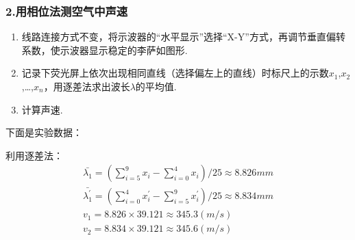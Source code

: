 \documentclass[12pt,a4paper,UTF8]{ctexart}
\begin{document}
	\subsubsection*{2.用相位法测空气中声速}
		\begin{enumerate}[(1)]
		\item 线路连接方式不变，将示波器的“水平显示”选择“X-Y”方式，再调节垂直偏转系数，使示波器显示稳定的李萨如图形.
		\item 记录下荧光屏上依次出现相同直线（选择偏左上的直线）时标尺上的示数$x_1$,$x_2$,\dots,$x_n$，用逐差法求出波长$\lambda$的平均值.
		\item 计算声速.
		\end{enumerate}
		下面是实验数据：
		\begin{table}[htbp]
		\centering
		\caption{极值法测空气中声速数据表}
		\end{table}
		
		
			
		\newpage
		利用逐差法：
		\begin{gather*}
		\bar{\lambda_1}=(\sum_{i=5}^{9}x_i - \sum_{i=0}^{4}x_i)/25 \approx 8.826mm \\
		\bar{\lambda_1^{\prime}}=(\sum_{i=0}^{4}x_i^{\prime} - \sum_{i=5}^{9}x_i^{\prime})/25 \approx 8.834mm \\
		v_1=8.826 \times 39.121 \approx 345.3(m/s) \\
		v_2=8.834 \times 39.121 \approx 345.6(m/s)
		\end{gather*}
		
\end{document}

